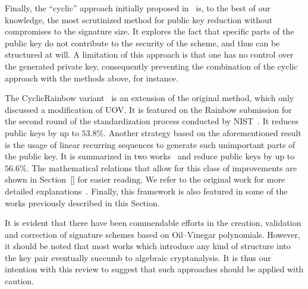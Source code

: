\documentclass[draft, 12pt, a4paper, oneside]{memoir}
\begin{document}
Finally, the ``cyclic'' approach initially proposed in~\cite{} is, to the best of our knowledge, the most scrutinized method for public key reduction without compromises to the signature size. It explores the fact that specific parts of the public key do not contribute to the security of the scheme, and thus can be structured at will. A limitation of this approach is that one has no control over the generated private key, consequently preventing the combination of the cyclic approach with the methods above, for instance.

The CyclicRainbow variant~\cite{} is an extension of the original method, which only discussed a modification of UOV. It is featured on the Rainbow submission for the second round of the standardization process conducted by NIST~\cite{}. It reduces public keys by up to $53.8\%$. Another strategy based on the aforementioned result is the usage of linear recurring sequences to generate such unimportant parts of the public key. It is summarized in two works~\cite{} and reduce public keys by up to $56.6\%$. The mathematical relations that allow for this class of improvements are shown in Section~\ref{} for easier reading. We refer to the original work for more detailed explanations~\cite{}. Finally, this framework is also featured in some of the works previously described in this Section.

It is evident that there have been commendable efforts in the creation, validation and correction of signature schemes based on Oil--Vinegar polynomials. However, it should be noted that most works which introduce any kind of structure into the key pair eventually succumb to algebraic cryptanalysis. It is thus our intention with this review to suggest that such approaches should be applied with caution. 



\end{document}
